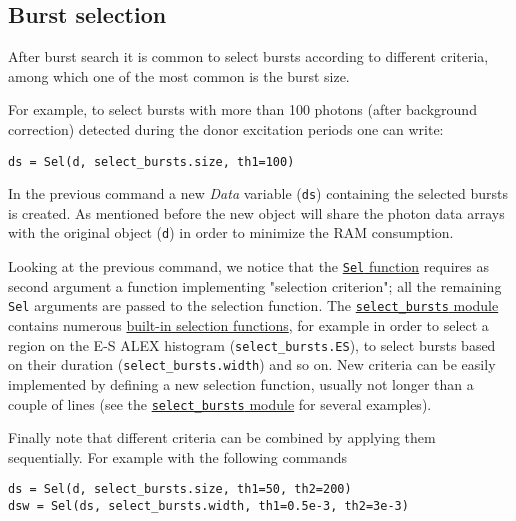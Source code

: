 \subsection{Burst selection}
\label{sec:burstsel}

After burst search it is common to select bursts according to different
criteria, among which one of the most common is the burst size.

For example, to select bursts with more than 100 photons (after background
correction) detected during the donor excitation periods one can write:

\begin{verbatim}
ds = Sel(d, select_bursts.size, th1=100)
\end{verbatim}

In the previous command a new \textit{Data} variable (\verb|ds|) containing the selected
bursts is created. As mentioned before the new object will share the photon data
arrays with the original object (\verb|d|) in order to minimize the RAM
consumption.

Looking at the previous command, we notice that the
\href{http://fretbursts.readthedocs.org/en/latest/burst\_selection.html#fretbursts.burstlib.Sel}{\texttt{Sel} function}
requires as second argument a function implementing "selection criterion"; all the 
remaining \verb|Sel| arguments are passed to the selection function. The
\href{http://fretbursts.readthedocs.org/en/latest/burst_selection.html}{\texttt{select\_bursts} module} 
contains numerous 
\href{http://fretbursts.readthedocs.org/en/latest/burst_selection.html#module-fretbursts.select_bursts}{built-in selection functions}, 
for example in order to select a region on the E-S ALEX histogram (\verb|select_bursts.ES|), 
to select bursts based on their duration (\verb|select_bursts.width|) and so on.
New criteria can be easily implemented by defining a new selection function, usually 
not longer than a couple of lines (see the
\href{https://github.com/tritemio/FRETBursts/blob/master/fretbursts/select\_bursts.py}{\texttt{select\_bursts} module} for several examples).

Finally note that different criteria can be combined by applying them sequentially. 
For example with the following commands

\begin{verbatim}
ds = Sel(d, select_bursts.size, th1=50, th2=200)
dsw = Sel(ds, select_bursts.width, th1=0.5e-3, th2=3e-3)
\end{verbatim}

